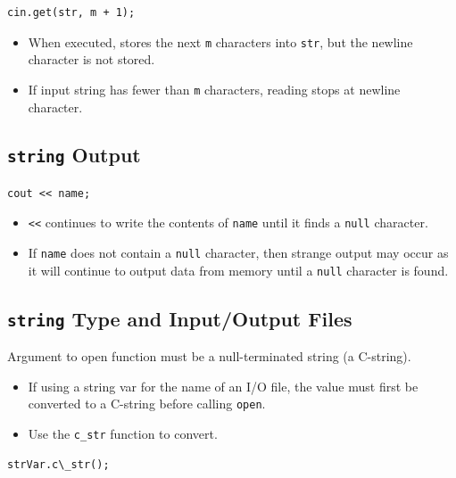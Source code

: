 \documentclass{article}
\begin{document}
\begin{lstlisting}[caption={Read Strings with Blanks with \texttt{get}}]
  cin.get(str, m + 1);
\end{lstlisting}

\begin{itemize}
  \item When executed, stores the next \texttt{m} characters into \texttt{str}, but the
newline character is not stored.
  \item If input string has fewer than \texttt{m} characters, reading stops at
    newline character.
\end{itemize}

\subsection{\texttt{string} Output}
\begin{lstlisting}[caption={String Output Example}]
  cout << name;
\end{lstlisting}

\begin{itemize}
  \item \texttt{<<} continues to write the contents of \texttt{name} until it
    finds a \texttt{null} character.
  \item If \texttt{name} does not contain a \texttt{null} character, then
    strange output may occur as it will continue to output data from memory until a
    \texttt{null} character is found.
\end{itemize}


\subsection{\texttt{string} Type and Input/Output Files}
Argument to open function must be a null-terminated string (a C-string).

\begin{itemize}
  \item If using a string var for the name of an I/O file, the value must first
    be converted to a C-string before calling \texttt{open}.
  \item Use the \texttt{c\_str} function to convert.
\end{itemize}

\begin{lstlisting}[caption={\texttt{c\_str} Syntax}]
  strVar.c\_str();
\end{lstlisting}
\end{document}
